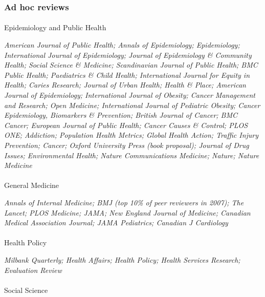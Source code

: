 \documentclass[
  letterpaper,
  DIV=11,
  numbers=noendperiod]{scrartcl}
\makeatletter
\let\oldparagraph\paragraph
\renewcommand{\paragraph}{
    \@ifstar
      \xxxParagraphStar
      \xxxParagraphNoStar
  }
\newcommand{\xxxParagraphStar}[1]{\oldparagraph*{#1}\mbox{}}
\newcommand{\xxxParagraphNoStar}[1]{\oldparagraph{#1}\mbox{}}
\makeatother
\begin{document}
\subsubsection{Ad hoc reviews}\label{ad-hoc-reviews}

\paragraph{Epidemiology and Public
Health}\label{epidemiology-and-public-health}

\emph{American Journal of Public Health; Annals of Epidemiology;
Epidemiology; International Journal of Epidemiology; Journal of
Epidemiology \& Community Health; Social Science \& Medicine;
Scandinavian Journal of Public Health; BMC Public Health; Paediatrics \&
Child Health; International Journal for Equity in Health; Caries
Research; Journal of Urban Health; Health \& Place; American Journal of
Epidemiology; International Journal of Obesity; Cancer Management and
Research; Open Medicine; International Journal of Pediatric Obesity;
Cancer Epidemiology, Biomarkers \& Prevention; British Journal of
Cancer; BMC Cancer; European Journal of Public Health; Cancer Causes \&
Control; PLOS ONE; Addiction; Population Health Metrics; Global Health
Action; Traffic Injury Prevention; Cancer; Oxford University Press (book
proposal); Journal of Drug Issues; Environmental Health; Nature
Communications Medicine; Nature; Nature Medicine }

\paragraph{General Medicine}\label{general-medicine}

\emph{Annals of Internal Medicine; BMJ (top 10\% of peer reviewers in
2007); The Lancet; PLOS Medicine; JAMA; New England Journal of Medicine;
Canadian Medical Association Journal; JAMA Pediatrics; Canadian J
Cardiology}

\paragraph{Health Policy}\label{health-policy}

\emph{Milbank Quarterly; Health Affairs; Health Policy; Health Services
Research; Evaluation Review}

\paragraph{Social Science}\label{social-science}
\end{document}
